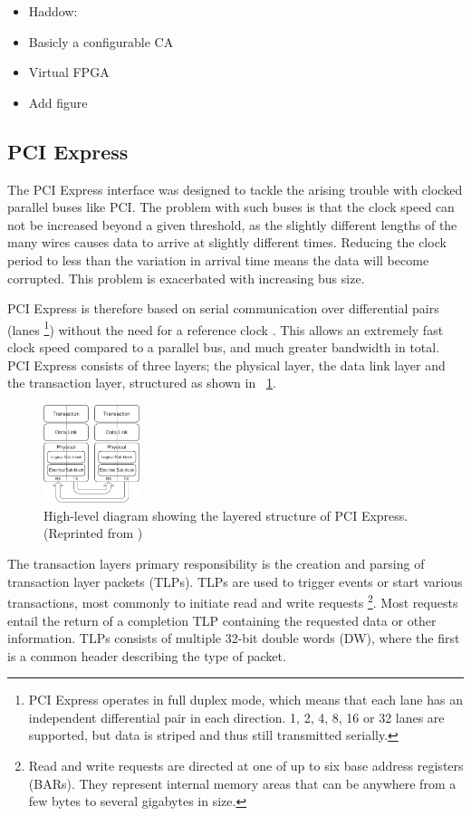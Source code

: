 \begin{itemize}
    \item Haddow: \cite{haddow2000sblock}
    \item Basicly a configurable CA
    \item Virtual FPGA
    \item Add figure
\end{itemize}

\subsection{PCI Express}

The PCI Express interface was designed to tackle the arising trouble with clocked parallel buses like PCI.
The problem with such buses is that the clock speed can not be increased beyond a given threshold, as the slightly different lengths of the many wires causes data to arrive at slightly different times.
Reducing the clock period to less than the variation in arrival time means the data will become corrupted.
This problem is exacerbated with increasing bus size.

PCI Express is therefore based on serial communication over differential pairs (lanes \footnote{
        PCI Express operates in full duplex mode, which means that each lane has an independent differential pair in each direction.
        1, 2, 4, 8, 16 or 32 lanes are supported, but data is striped and thus still transmitted serially.
    }) without the need for a reference clock \cite{pcie}.
This allows an extremely fast clock speed compared to a parallel bus, and much greater bandwidth in total.
PCI Express consists of three layers; the physical layer, the data link layer and the transaction layer, structured as shown in \figurename~\ref{fig:pcie}.

\begin{figure}[!ht]
    \centering
    \includegraphics[width=0.25\textwidth]{figures/pcie}
    \caption{High-level diagram showing the layered structure of PCI Express. (Reprinted from \cite{pcie})}
    \label{fig:pcie}
\end{figure}

The transaction layers primary responsibility is the creation and parsing of transaction layer packets (TLPs).
TLPs are used to trigger events or start various transactions, most commonly to initiate read and write requests \footnote{
        Read and write requests are directed at one of up to six base address registers (BARs).
        They represent internal memory areas that can be anywhere from a few bytes to several gigabytes in size.
    }.
Most requests entail the return of a completion TLP containing the requested data or other information.
TLPs consists of multiple 32-bit double words (DW), where the first is a common header describing the type of packet.

